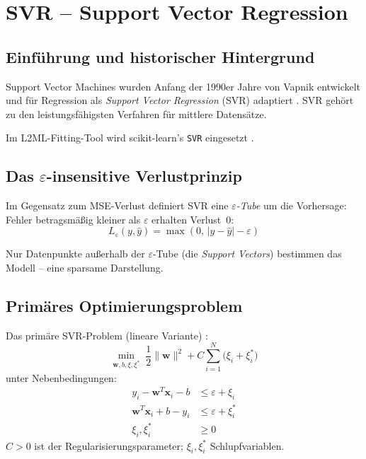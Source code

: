 \documentclass[11pt,a4paper]{report}
\begin{document}
\chapter{SVR -- Support Vector Regression}

\section{Einf\"{u}hrung und historischer Hintergrund}

Support Vector Machines wurden Anfang der 1990er Jahre von Vapnik entwickelt und f\"{u}r
Regression als \emph{Support Vector Regression} (SVR) adaptiert
\cite{vapnik1998, drucker1997, smola2004}. SVR geh\"{o}rt zu den leistungsf\"{a}higsten Verfahren
f\"{u}r mittlere Datens\"{a}tze.

Im L2ML-Fitting-Tool wird scikit-learn's \texttt{SVR} eingesetzt \cite{sklearn_svr, pedregosa2011}.

\section{Das $\varepsilon$-insensitive Verlustprinzip}
\label{sec:svr_loss}

Im Gegensatz zum MSE-Verlust definiert SVR eine \emph{$\varepsilon$-Tube} um die Vorhersage:
Fehler betragsmä\ss{}ig kleiner als $\varepsilon$ erhalten Verlust~0:
\begin{equation}
L_\varepsilon(y, \hat{y}) = \max\!\left(0,\, |y - \hat{y}| - \varepsilon\right)
\label{eq:eps_loss}
\end{equation}

Nur Datenpunkte au\ss{}erhalb der $\varepsilon$-Tube (die \emph{Support Vectors}) bestimmen das
Modell -- eine sparsame Darstellung.

\section{Prim\"{a}res Optimierungsproblem}

Das prim\"{a}re SVR-Problem (lineare Variante) \cite{vapnik1998, smola2004}:
\begin{equation}
\min_{\mathbf{w}, b, \xi, \xi^*}
\;\frac{1}{2}\lVert\mathbf{w}\rVert^2 + C\sum_{i=1}^N\bigl(\xi_i + \xi_i^*\bigr)
\label{eq:svr_primal}
\end{equation}
unter Nebenbedingungen:
\begin{align}
y_i - \mathbf{w}^T\mathbf{x}_i - b &\leq \varepsilon + \xi_i \\
\mathbf{w}^T\mathbf{x}_i + b - y_i &\leq \varepsilon + \xi_i^* \\
\xi_i, \xi_i^* &\geq 0
\end{align}
$C > 0$ ist der Regularisierungsparameter; $\xi_i, \xi_i^*$ Schlupfvariablen.
\end{document}
